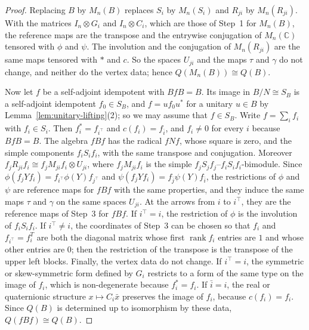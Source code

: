\documentclass[12pt, a4paper]{report}
\theoremstyle{plain}
\theoremstyle{definition}
\theoremstyle{remark}
\theoremstyle{plain}
\newcommand{\CC}{\mathbb{C}}
\begin{document}
\begin{proof}
Replacing $B$ by $M_n(B)$ replaces $S_i$ by $M_n(S_i)$ and $R_{ji}$ by $M_n(R_{ji})$. With the matrices $I_n\otimes G_i$ and $I_n\otimes C_i$, which are those of Step~1 for $M_n(B)$, the reference maps are the transpose and the entrywise conjugation of $M_n(\CC)$ tensored with $\phi$ and $\psi$. The involution and the conjugation of $M_n(R_{ji})$ are the same maps tensored with $*$ and $c$. So the spaces $U_{ji}$ and the maps $\tau$ and $\gamma$ do not change, and neither do the vertex data; hence $Q(M_n(B))\cong Q(B)$.

Now let $f$ be a self-adjoint idempotent with $BfB=B$. Its image in $B/N\cong S_B$ is a self-adjoint idempotent $f_0\in S_B$, and $f=uf_0u^*$ for a unitary $u\in B$ by Lemma~\ref{lem:unitary-lifting}(2); so we may assume that $f\in S_B$. Write $f=\sum_if_i$ with $f_i\in S_i$. Then $f_i^*=f_{i^{\top}}$ and $c(f_i)=f_{\bar i}$, and $f_i\neq0$ for every $i$ because $BfB=B$. The algebra $fBf$ has the radical $fNf$, whose square is zero, and the simple components $f_iS_if_i$, with the same transpose and conjugation. Moreover $f_jR_{ji}f_i\cong f_jM_{ji}f_i\otimes U_{ji}$, where $f_jM_{ji}f_i$ is the simple $f_jS_jf_j$--$f_iS_if_i$-bimodule. Since $\phi(f_jYf_i)=f_{i^{\top}}\phi(Y)f_{j^{\top}}$ and $\psi(f_jYf_i)=f_{\bar j}\psi(Y)f_{\bar i}$, the restrictions of $\phi$ and $\psi$ are reference maps for $fBf$ with the same properties, and they induce the same maps $\tau$ and $\gamma$ on the same spaces $U_{ji}$. At the arrows from $i$ to $i^{\top}$, they are the reference maps of Step~3 for $fBf$. If $i^{\top}=i$, the restriction of $\phi$ is the involution of $f_iS_if_i$. If $i^{\top}\neq i$, the coordinates of Step~3 can be chosen so that $f_i$ and $f_{i^{\top}}=f_i^T$ are both the diagonal matrix whose first $\operatorname{rank}f_i$ entries are $1$ and whose other entries are $0$; then the restriction of the transpose is the transpose of the upper left blocks. Finally, the vertex data do not change. If $i^{\top}=i$, the symmetric or skew-symmetric form defined by $G_i$ restricts to a form of the same type on the image of $f_i$, which is non-degenerate because $f_i^*=f_i$. If $\bar i=i$, the real or quaternionic structure $x\mapsto C_i\bar x$ preserves the image of $f_i$, because $c(f_i)=f_i$. Since $Q(B)$ is determined up to isomorphism by these data, $Q(fBf)\cong Q(B)$.


\end{proof}
\end{document}

